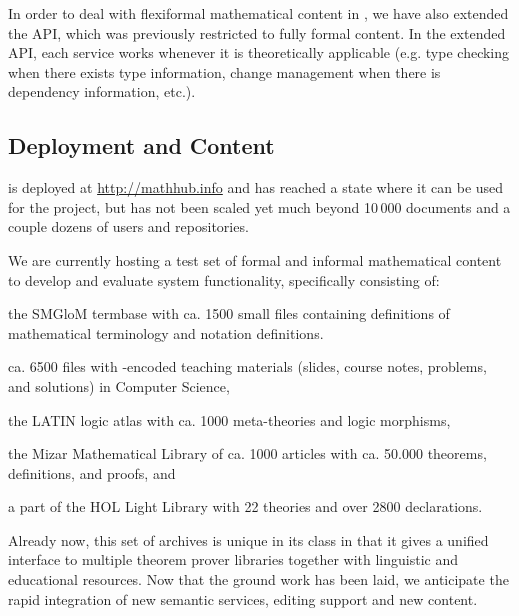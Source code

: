 In order to deal with flexiformal mathematical content in \omdoc, we have also extended
the \mmt API, which was previously restricted to fully formal content. In the extended
\mmt API, each \mmt service works whenever it is theoretically applicable (e.g. type
checking when there exists type information, change management when there is dependency
information, etc.).

\subsection{Deployment and Content}

\sys is deployed at \url{http://mathhub.info} and has reached a state where it can be
used for the \pn project, but has not been scaled yet much beyond 10\,000 documents and a
couple dozens of users and repositories.

We are currently hosting a test set of formal and informal mathematical
content to develop and evaluate system functionality, specifically consisting of:
\begin{compactenum}[\em i\rm)]
\item the SMGloM termbase with ca. 1500 small \sTeX files containing definitions of
  mathematical terminology and notation definitions.
\item ca. 6500 files with \sTeX-encoded teaching materials (slides, course notes,
  problems, and solutions) in Computer Science,
\item the LATIN logic atlas with ca. 1000 meta-theories and logic morphisms,
\item the Mizar Mathematical Library of ca. 1000 articles with ca. 50.000 theorems,
  definitions, and proofs, and
\item a part of the HOL Light Library with 22 theories and over 2800 declarations.
\end{compactenum}

Already now, this set of archives is unique in its class in that it gives a
unified interface to multiple theorem prover libraries together with linguistic
and educational resources. Now that the ground work has been laid, we anticipate
the rapid integration of new semantic services, editing support and new content.


